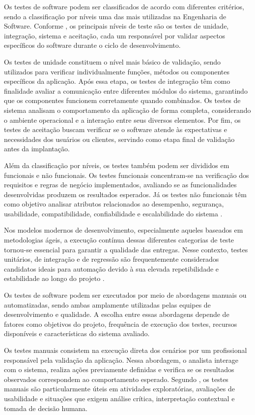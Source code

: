 \documentclass{UNESC}
\begin{document}
Os testes de software podem ser classificados de acordo com diferentes critérios, sendo a classificação por níveis uma das mais utilizadas na Engenharia de Software. Conforme , os principais níveis de teste são os testes de unidade, integração, sistema e aceitação, cada um responsável por validar aspectos específicos do software durante o ciclo de desenvolvimento.

Os testes de unidade constituem o nível mais básico de validação, sendo utilizados para verificar individualmente funções, métodos ou componentes específicos da aplicação. Após essa etapa, os testes de integração têm como finalidade avaliar a comunicação entre diferentes módulos do sistema, garantindo que os componentes funcionem corretamente quando combinados. Os testes de sistema analisam o comportamento da aplicação de forma completa, considerando o ambiente operacional e a interação entre seus diversos elementos. Por fim, os testes de aceitação buscam verificar se o software atende às expectativas e necessidades dos usuários ou clientes, servindo como etapa final de validação antes da implantação.

Além da classificação por níveis, os testes também podem ser divididos em funcionais e não funcionais. Os testes funcionais concentram-se na verificação dos requisitos e regras de negócio implementados, avaliando se as funcionalidades desenvolvidas produzem os resultados esperados. Já os testes não funcionais têm como objetivo analisar atributos relacionados ao desempenho, segurança, usabilidade, compatibilidade, confiabilidade e escalabilidade do sistema \cite{myers2012}.

Nos modelos modernos de desenvolvimento, especialmente aqueles baseados em metodologias ágeis, a execução contínua dessas diferentes categorias de teste tornou-se essencial para garantir a qualidade das entregas. Nesse contexto, testes unitários, de integração e de regressão são frequentemente considerados candidatos ideais para automação devido à sua elevada repetibilidade e estabilidade ao longo do projeto \cite{gandini2002}.

Os testes de software podem ser executados por meio de abordagens manuais ou automatizadas, sendo ambas amplamente utilizadas pelas equipes de desenvolvimento e qualidade. A escolha entre essas abordagens depende de fatores como objetivos do projeto, frequência de execução dos testes, recursos disponíveis e características do sistema avaliado.

Os testes manuais consistem na execução direta dos cenários por um profissional responsável pela validação da aplicação. Nessa abordagem, o analista interage com o sistema, realiza ações previamente definidas e verifica se os resultados observados correspondem ao comportamento esperado. Segundo , os testes manuais são particularmente úteis em atividades exploratórias, avaliações de usabilidade e situações que exigem análise crítica, interpretação contextual e tomada de decisão humana.
\end{document}
